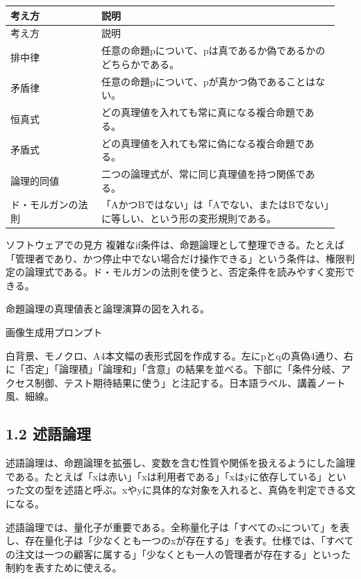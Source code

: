 \documentclass[uplatex,dvipdfmx,a4paper,10pt]{jsarticle}
\begin{document}
\begin{longtable}{>{\raggedright\arraybackslash}p{0.26\linewidth} >{\raggedright\arraybackslash}p{0.68\linewidth}}
\toprule
考え方 & 説明 \\
\midrule
\endfirsthead
\toprule
考え方 & 説明 \\
\midrule
\endhead
排中律 & 任意の命題pについて、pは真であるか偽であるかのどちらかである。 \\
矛盾律 & 任意の命題pについて、pが真かつ偽であることはない。 \\
恒真式 & どの真理値を入れても常に真になる複合命題である。 \\
矛盾式 & どの真理値を入れても常に偽になる複合命題である。 \\
論理的同値 & 二つの論理式が、常に同じ真理値を持つ関係である。 \\
ド・モルガンの法則 & 「AかつBではない」は「Aでない、またはBでない」に等しい、という形の変形規則である。 \\
\bottomrule
\end{longtable}
\begin{infobox}{ソフトウェアでの見方}
複雑なif条件は、命題論理として整理できる。たとえば「管理者であり、かつ停止中でない場合だけ操作できる」という条件は、権限判定の論理式である。ド・モルガンの法則を使うと、否定条件を読みやすく変形できる。
\end{infobox}
\begin{todobox}
命題論理の真理値表と論理演算の図を入れる。

画像生成用プロンプト

白背景、モノクロ、A4本文幅の表形式図を作成する。左にpとqの真偽4通り、右に「否定」「論理積」「論理和」「含意」の結果を並べる。下部に「条件分岐、アクセス制御、テスト期待結果に使う」と注記する。日本語ラベル、講義ノート風、細線。
\end{todobox}
\subsection{1.2 述語論理}
述語論理は、命題論理を拡張し、変数を含む性質や関係を扱えるようにした論理である。たとえば「xは赤い」「xは利用者である」「xはyに依存している」といった文の型を述語と呼ぶ。xやyに具体的な対象を入れると、真偽を判定できる文になる。

述語論理では、量化子が重要である。全称量化子は「すべてのxについて」を表し、存在量化子は「少なくとも一つのxが存在する」を表す。仕様では、「すべての注文は一つの顧客に属する」「少なくとも一人の管理者が存在する」といった制約を表すために使える。
\end{document}
